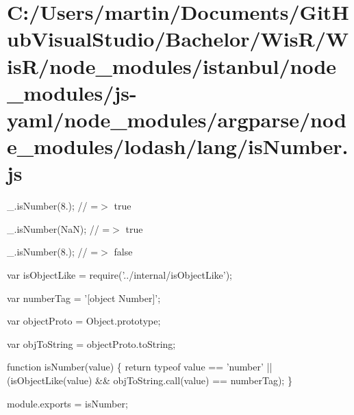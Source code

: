 \hypertarget{_c_1_2_users_2martin_2_documents_2_git_hub_visual_studio_2_bachelor_2_wis_r_2_wis_r_2node_module15b222ebdd7d4f96c88a523ae7c9d8b2}{}\section{C\+:/\+Users/martin/\+Documents/\+Git\+Hub\+Visual\+Studio/\+Bachelor/\+Wis\+R/\+Wis\+R/node\+\_\+modules/istanbul/node\+\_\+modules/js-\/yaml/node\+\_\+modules/argparse/node\+\_\+modules/lodash/lang/is\+Number.\+js}
\+\_\+.\+is\+Number(8.); // =$>$ true

\+\_\+.\+is\+Number(\+Na\+N); // =$>$ true

\+\_\+.\+is\+Number(\textquotesingle{}8.\textquotesingle{}); // =$>$ false


\begin{DoxyCodeInclude}
var isObjectLike = require(\textcolor{stringliteral}{'../internal/isObjectLike'});

var numberTag = \textcolor{stringliteral}{'[object Number]'};

var objectProto = Object.prototype;

var objToString = objectProto.toString;

\textcolor{keyword}{function} isNumber(value) \{
  \textcolor{keywordflow}{return} typeof value == \textcolor{stringliteral}{'number'} || (isObjectLike(value) && objToString.call(value) == numberTag);
\}

module.exports = isNumber;
\end{DoxyCodeInclude}
 